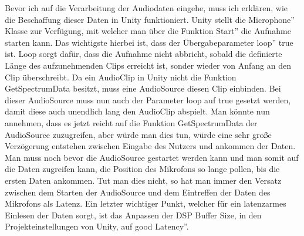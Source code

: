 Bevor ich auf die Verarbeitung der Audiodaten eingehe, muss ich erklären, wie die Beschaffung dieser Daten in Unity funktioniert. Unity stellt die \glqq Microphone'' Klasse zur Verfügung, mit welcher man über die Funktion \glqq Start'' die Aufnahme starten kann. Das wichtigste hierbei ist, dass der Übergabeparameter \glqq loop'' true ist. Loop sorgt dafür, dass die Aufnahme nicht abbricht, sobald die definierte Länge des aufzunehmenden Clips erreicht ist, sonder wieder von Anfang an den Clip überschreibt. Da ein AudioClip in Unity nicht die Funktion GetSpectrumData besitzt, muss eine AudioSource diesen Clip einbinden. Bei dieser AudioSource muss nun auch der Parameter loop auf true gesetzt werden, damit diese auch unendlich lang den AudioClip abspielt. Man könnte nun annehmen, dass es jetzt reicht auf die Funktion GetSpectrumData der AudioSource zuzugreifen, aber würde man dies tun, würde eine sehr große Verzögerung entstehen zwischen Eingabe des Nutzers und ankommen der Daten. Man muss noch bevor die AudioSource gestartet werden kann und man somit auf die Daten zugreifen kann, die Position des Mikrofons so lange pollen, bis die ersten Daten ankommen. Tut man dies nicht, so hat man immer den Versatz zwischen dem Starten der AudioSource und dem Eintreffen der Daten des Mikrofons als Latenz. Ein letzter wichtiger Punkt, welcher für ein latenzarmes Einlesen der Daten sorgt, ist das Anpassen der DSP Buffer Size, in den Projekteinstellungen von Unity, auf \glqq good Latency''.  \\

